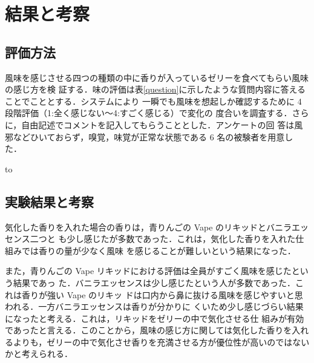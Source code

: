 \section{結果と考察}

\subsection{評価方法}

風味を感じさせる四つの種類の中に香りが入っているゼリーを食べてもらい風味の感じ方を検
証する．味の評価は表\ref{question}に示したような質問内容に答えることでこととする．システムにより
一瞬でも風味を想起しか確認するために 4 段階評価（1:全く感じない～4:すごく感じる）で変化の
度合いを調査する．さらに，自由記述でコメントを記入してもらうこととした．アンケートの回
答は風邪などひいておらず，嗅覚，味覚が正常な状態である 6 名の被験者を用意した．


\begin{table}[t]
    \caption{質問内容}
    \label{question}
    \hbox to
    \end{table}


\subsection{実験結果と考察}

気化した香りを入れた場合の香りは，青りんごの Vape のリキッドとバニラエッセンス二つと
も少し感じたが多数であった．これは，気化した香りを入れた仕組みでは香りの量が少なく風味
を感じることが難しいという結果になった．


また，青りんごの Vape リキッドにおける評価は全員がすごく風味を感じたという結果であっ
た．バニラエッセンスは少し感じたという人が多数であった．これは香りが強い Vape のリキッ
ドは口内から鼻に抜ける風味を感じやすいと思われる．一方バニラエッセンスは香りが分かりに
くいため少し感じづらい結果になったと考える．これは，リキッドをゼリーの中で気化させる仕
組みが有効であったと言える．このことから，風味の感じ方に関しては気化した香りを入れるよりも，ゼリーの中で気化させ香りを充満させる方が優位性が高いのではないかと考えられる．


